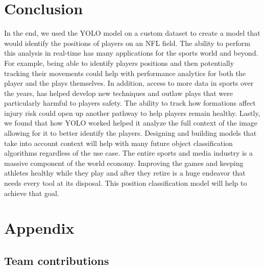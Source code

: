 \section{Conclusion}

In the end, we used the YOLO model on a custom dataset to create a model that would identify the positions of players on an NFL field. The ability to perform this analysis in real-time has many applications for the sports world and beyond. For example, being able to identify players positions and then potentially tracking their movements could help with performance analytics for both the player and the plays themselves. In addition, access to more data in sports over the years, has helped develop new techniques and outlaw plays that were particularly harmful to players safety. The ability to track how formations affect injury risk could open up another pathway to help players remain healthy. Lastly, we found that how YOLO worked helped it analyze the full context of the image allowing for it to better identify the players. Designing and building models that take into account context will help with many future object classification algorithms regardless of the use case. The entire sports and media industry is a massive component of the world economy. Improving the games and keeping athletes healthy while they play and after they retire is a huge endeavor that needs every tool at its disposal. This position classification model will help to achieve that goal.
{\small


}

\section*{Appendix}

\subsection*{Team contributions}

